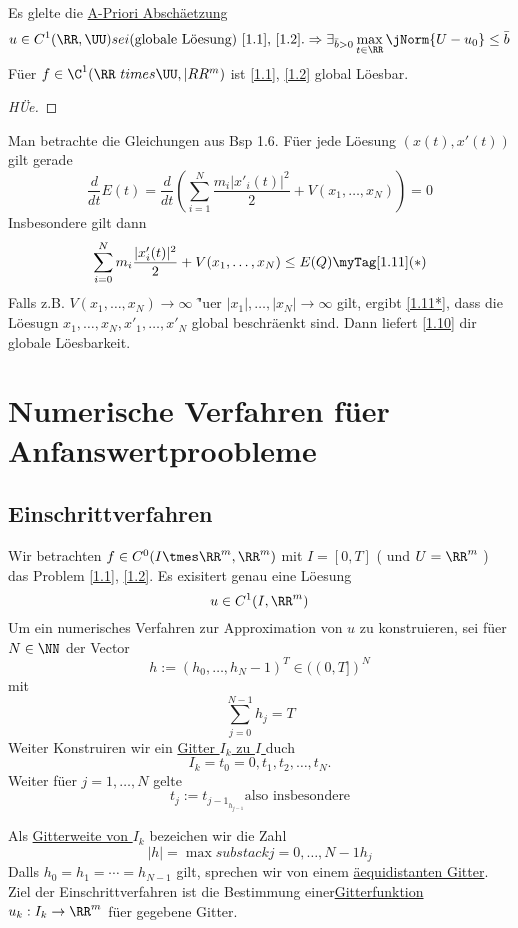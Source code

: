 \begin{Kor} \label{1.10}
  Es glelte die \uline{A-Priori Absch\"aetzung} \[ u \in C^1(\RR,\UU) sei 
  \text{(globale L\"oesung) \eqref{1.1}, \eqref{1.2}.} \\ 
  \Rightarrow \exists_{\bar{b} > 0} \max_{\substack t \in \RR} \jNorm{U - u_0}
  \leq \bar{b} \]
  F\"uer \( f \in \C^1(\RR\ times \UU, |RR^m) \) ist \eqref{1.1}, \eqref{1.2}
  global L\"oesbar.
\end{Kor}
\begin{proof} [H\"Ue] \myQEDEnd 
\end{proof}
\begin{Bsp}
  Man betrachte die Gleichungen aus Bsp 1.6. F\"uer jede L\"oesung \( (x(t),
  x'(t)) \) gilt gerade \[ \dfrac{d}{dt} E(t) = \dfrac{d}{dt}(\sum_{i=1}^N
  \frac{m_i | x'_i (t)|^2}{2} + V(x_1,\dotsc,x_N)) = 0 \] Insbesondere gilt dann
  \[ \sum_{i=0}^N m_i \frac{|x'_i(t)|^2}{2} + V(x_1,\dotsc,x_N) \leq E(Q)
  \myTag[1.11](*) \]
  Falls z.B. \( V(x_1,\dotsc,x_N) \rightarrow \infty \) \f"uer \( |x_1|,\dotsc,|x_N|
  \rightarrow \infty \) gilt, ergibt \eqref{1.11*}, dass die L\"oesugn \( x_1,
  \dotsc, x_N, x'_1, \dotsc, x'_N \) global beschr\"aenkt sind. Dann liefert
  \ref{1.10} dir globale L\"oesbarkeit.
  \myQEDEnd
\end{Bsp}

\chapter{Numerische Verfahren f\"uer Anfanswertproobleme}

\section{Einschrittverfahren}

Wir betrachten \Fuer \( f\in C^0(I\tmes \RR^m, \RR^m) \) mit \( I = [0,T] \) (
und \( U = \RR^m \) ) das Problem \eqref{1.1}, \eqref{1.2}. Es exisitert genau
eine L\"oesung \[ u \in C^1(I, \RR^m) \]
Um ein numerisches Verfahren zur Approximation von \( u \) zu konstruieren, sei
f\"uer \( N \in \NN \) der Vector \[ h:= (h_0,\dotsc,h_N-1)^T \in ((0,T])^N \]
mit \[ \sum_{j=0}^{N-1}h_j=T  \]
Weiter Konstruiren wir ein \uline{Gitter \( I_k \) zu \( I \) } duch \[
  I_k = {t_0 = 0, t_1, t_2, \dotsc, t_N}. \]
Weiter f\"uer \( j= 1,\dotsc,N \) gelte \[t_j := t_{j-1} _ h_{j-1} \text{also
insbesondere} \] 

Als \uline{Gitterweite von \( I_k  \)} bezeichen wir die Zahl \[ |h| =
  \max{substack j = 0,\dotsc,N-1}{h_j} \]
Dalls \( h_0 = h_1 = \cdots = h_{N-1} \) gilt, sprechen wir von einem
\uline{\"aequidistanten Gitter}. \\
Ziel der Einschrittverfahren ist die Bestimmung einer\uline{Gitterfunktion}
$u_k:I_k\rightarrow\RR^m$ f\"uer gegebene Gitter.

